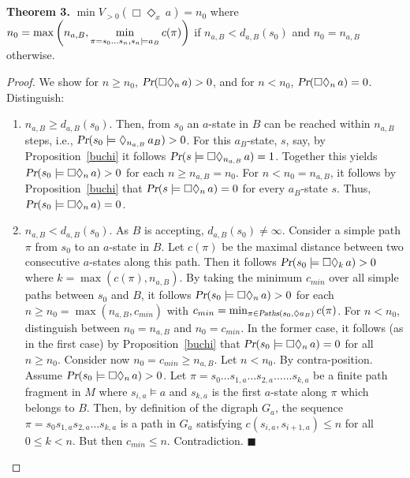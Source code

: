 \documentclass{llncs}
\newcommand{\smPaths}{\mbox{\scriptsize \sl Paths}}
\renewcommand{\Pr}{\mbox{\rm Pr}}
\renewcommand{\Pr}{\mbox{\sl Pr}}
\renewcommand{\leq}{\leqslant}
\renewcommand{\geq}{\geqslant}
\newcommand{\de}{\Diamond}
\begin{document}
\section{}
\textbf{Theorem 3.}
$\min V_{>0}(\Box\de_x \, a) = n_0$ where $n_0 = \displaystyle\max \tiny{\left( n_{a,B}, \min_{\pi = s_0 \ldots s_n, s_n \models a_B} c(\pi) \right)}$ 
if $n_{a,B} < d_{a,B}(s_0)$ and $n_0 = n_{a,B}$ otherwise.

\begin{proof}
We show for $n \geq n_0$, $\Pr(\Box\de_n \, a) > 0$, and for $n < n_0$,
$\Pr(\Box\de_n \, a) = 0$.
Distinguish:
\begin{enumerate}
\item $n_{a,B} \geq d_{a,B}(s_0)$.  
Then, from $s_0$ an $a$-state in $B$ can be reached within $n_{a,B}$ steps, i.e., $\Pr(s_0 \models \de_{n_{a,B}} \, a_B) > 0$.
For this $a_B$-state, $s$, say, by Proposition~\ref{buchi} it follows $\Pr(s \models \Box \de_{n_{a,B}} \, a) = 1$.
Together this yields $\Pr(s_0 \models \Box \de_n \, a) > 0$ for each $n \geq n_{a,B} = n_0$.
For $n < n_0 = n_{a,B}$, it follows by Proposition~\ref{buchi} that $\Pr(s \models \Box \de_n \, a) = 0$ for every $a_B$-state $s$.
Thus, $\Pr(s_0 \models \Box\de_n \, a) = 0$.
\item
$n_{a,B} < d_{a,B}(s_0)$.  
As $B$ is accepting, $d_{a,B}(s_0) \neq \infty$.
Consider a simple path $\pi$ from $s_0$ to an $a$-state in $B$.
Let $c(\pi)$ be the maximal distance between two consecutive $a$-states along this path.
Then it follows $\Pr(s_0 \models \Box \de_k \, a) > 0$ where $k = \max (c(\pi), n_{a,B})$.
By taking the minimum $c_{min}$ over all simple paths between $s_0$ and $B$, it follows $\Pr(s_0 \models \Box \de_n \, a) > 0$ for each $n \geq n_0 = \max (n_{a,B}, c_{min})$ with $c_{min} = \min_{\pi \in \smPaths(s_0, \de a_B)} c(\pi)$.
For $n < n_0$, distinguish between $n_0 = n_{a,B}$ and $n_0 = c_{min}$.
In the former case, it follows (as in the first case) by Proposition~\ref{buchi} that $\Pr(s_0 \models \Box\de_n \, a) = 0$ for all $n \geq n_0$. 
Consider now $n_0 = c_{min} \geq n_{a,B}$.
Let $n < n_0$.
By contra-position.
Assume $\Pr(s_0 \models \Box \de_n \, a) > 0$.
Let $\pi = s_0 \ldots s_{1,a} \ldots s_{2,a} \ldots \ldots s_{k,a}$ be a finite path fragment in $M$ where $s_{i,a} \models a$ and $s_{k,a}$ is the first $a$-state along $\pi$ which belongs to $B$.
Then, by definition of the digraph $G_a$, the sequence $\pi = s_0 s_{1,a} s_{2,a} \ldots s_{k,a}$ is a path in $G_a$ satisfying $c(s_{i,a},s_{i{+}1,a}) \leq n$ for all $0 \leq k < n$. 
But then $c_{min} \leq n$.
Contradiction. \hfill $\blacksquare$
\end{enumerate} \end{proof}
\end{document}

